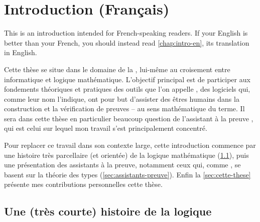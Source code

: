 \chapter{Introduction (Français)}
\label{chap:intro-fr}

\margintoc

\begin{kaobox}[backgroundcolor=Black!10!White,frametitlebackgroundcolor=Black!10!White]
  This  is an introduction intended for French-speaking readers.
  If your English is better than your French,
  you should instead read \cref{chap:intro-en}, its translation in English.
\end{kaobox}

Cette thèse se situe dans le domaine de la , lui-même au croisement entre informatique et logique mathématique.
L’objectif principal est de participer aux fondements théoriques et pratiques des outils
que l’on appelle , des logiciels qui, comme leur nom
l’indique, ont pour but d’assister des êtres humains dans la construction
et la vérification de preuves – au sens mathématique du terme. Il sera dans cette thèse
en particulier beaucoup question de l’assistant à la preuve , qui est celui
sur lequel mon travail s’est principalement concentré.

Pour replacer ce travail dans son contexte large, cette introduction commence par une histoire très parcellaire (et orientée) de la logique mathématique
(\cref{sec:logique-histoire}),
puis une présentation des assistants à la preuve,
notamment ceux qui, comme , se basent sur la théorie des types (\cref{sec:assistants-preuve}). Enfin la \cref{sec:cette-these} présente
mes contributions personnelles cette thèse.

\section{Une (très courte) histoire de la logique}
\label{sec:logique-histoire}

